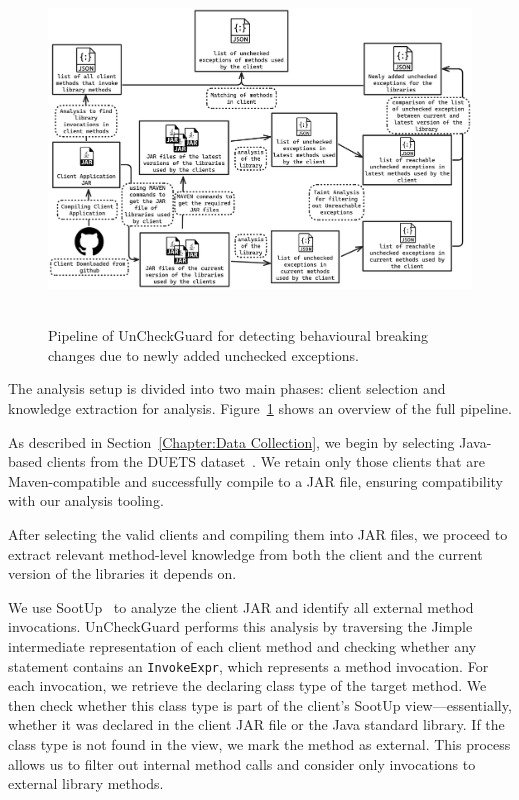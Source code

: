\begin{figure}[hbt!]
    \centering
    \includegraphics[height=260pt]{diagram/finalfpioeline.png}
    \caption{Pipeline of UnCheckGuard for detecting behavioural breaking changes due to newly added unchecked exceptions.}
    \label{fig:jsonjava}
\end{figure}

The analysis setup is divided into two main phases: client selection and knowledge extraction for analysis. Figure~\ref{fig:jsonjava} shows an overview of the full pipeline.

As described in Section~\ref{Chapter:Data Collection}, we begin by selecting Java-based clients from the DUETS dataset~\cite{durieux21:_duets}. We retain only those clients that are Maven-compatible and successfully compile to a JAR file, ensuring compatibility with our analysis tooling.

After selecting the valid clients and compiling them into JAR files, we proceed to extract relevant method-level knowledge from both the client and the current version of the libraries it depends on.

We use SootUp~\cite{Karakaya24:_sootup} to analyze the client JAR and identify all external method invocations. UnCheckGuard performs this analysis by traversing the Jimple intermediate representation of each client method and checking whether any statement contains an \texttt{InvokeExpr}, which represents a method invocation. For each invocation, we retrieve the declaring class type of the target method. We then check whether this class type is part of the client’s SootUp view---essentially, whether it was declared in the client JAR file or the Java standard library. If the class type is not found in the view, we mark the method as external. This process allows us to filter out internal method calls and consider only invocations to external library methods.


